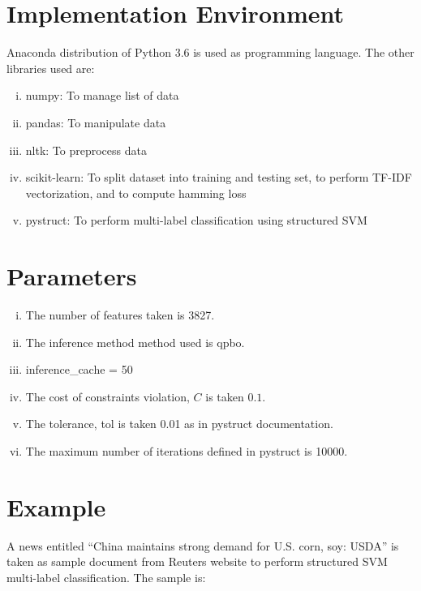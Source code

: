 \section{Implementation Environment}
Anaconda distribution of Python 3.6 is used as programming language. The other libraries used are:
\begin{enumerate}[i.]
\item numpy: To manage list of data
\item pandas: To manipulate data
\item nltk: To preprocess data
\item scikit-learn: To split dataset into training and testing set, to perform TF-IDF vectorization, and to compute hamming loss
\item pystruct: To perform multi-label classification using structured SVM
\end{enumerate}

\section{Parameters}
\begin{enumerate}[i.]
\item The number of features taken is 3827.
\item The inference method method used is qpbo.
\item inference\_cache = 50
\item The cost of constraints violation, $C$ is taken $0.1$.
\item The tolerance, tol is taken 0.01 as in pystruct documentation.
\item The maximum number of iterations defined in pystruct is 10000.
\end{enumerate}

\section{Example}
A news entitled “China maintains strong demand for U.S. corn, soy: USDA” is taken as sample document from Reuters website\cite{reuters-ex} to perform structured SVM multi-label classification. The sample is:


